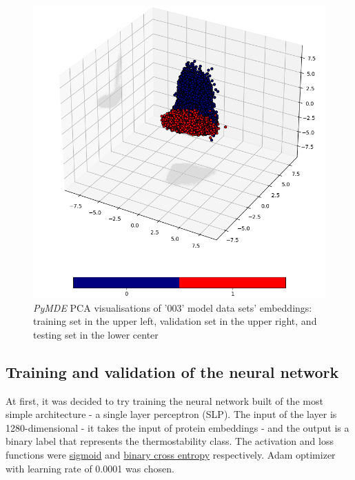 \documentclass[12pt]{article}
\begin{document}
\begin{figure}[h!]
		\includegraphics[scale=0.4]{003_test_v2_MDE_PCA.png}

		\caption{\textit{PyMDE} PCA visualisations of '003' model data sets' embeddings: training set
				in the upper left, validation set in the upper right, and 
				testing set in the lower center}
		\label{figure:PyMDEPCAembeddings003}
	\end{figure}

	\newpage

	\subsection{Training and validation of the neural network}

	At first, it was decided to try training the neural network built of
	the most simple architecture - a single layer perceptron (SLP). The input of the 
	layer is 1280-dimensional - it takes the input of protein embeddings - and the 
	output is a binary label that represents the thermostability class. The 
	activation and loss functions were 
	\href{https://pytorch.org/docs/stable/generated/torch.nn.Sigmoid.html}{sigmoid} 
	and 
	\href{https://pytorch.org/docs/stable/generated/torch.nn.BCELoss.html}{binary cross entropy} 
	respectively. 
	Adam optimizer \cite{kingma2014adam} 
	with learning rate of 0.0001 was chosen.
\end{document}
